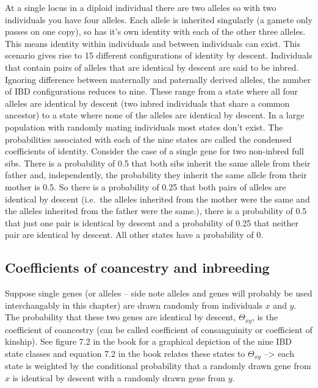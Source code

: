 \documentclass[
]{book}
\begin{document}
At a single locus in a diploid individual there are two alleles so with two individuals you have four alleles. Each allele is inherited singularly (a gamete only passes on one copy), so has it's own identity with each of the other three alleles. This means identity within individuals and between individuals can exist. This scenario gives rise to 15 different configurations of identity by descent. Individuals that contain pairs of alleles that are identical by descent are said to be inbred. Ignoring difference between maternally and paternally derived alleles, the number of IBD configurations reduces to nine. These range from a state where all four alleles are identical by descent (two inbred individuals that share a common ancestor) to a state where none of the alleles are identical by descent. In a large population with randomly mating individuals most states don't exist. The probabilities associated with each of the nine states are called the condensed coefficients of identity. Consider the case of a single gene for two non-inbred full sibs. There is a probability of 0.5 that both sibs inherit the same allele from their father and, independently, the probability they inherit the same allele from their mother is 0.5. So there is a probability of 0.25 that both pairs of alleles are identical by descent (i.e.~the alleles inherited from the mother were the same and the alleles inherited from the father were the same.), there is a probability of 0.5 that just one pair is identical by descent and a probability of 0.25 that neither pair are identical by descent. All other states have a probability of 0.

\hypertarget{coefficients-of-coancestry-and-inbreeding}{%
\subsection{Coefficients of coancestry and inbreeding}\label{coefficients-of-coancestry-and-inbreeding}}

Suppose single genes (or alleles -- side note alleles and genes will probably be used interchangably in this chapter) are drawn randomly from individuals \(x\) and \(y\). The probability that these two genes are identical by descent, \(\Theta_{xy}\), is the coefficient of coancestry (can be called coefficient of consanguinity or coefficient of kinship). See figure 7.2 in the book for a graphical depiction of the nine IBD state classes and equation 7.2 in the book relates these states to \(\Theta_{xy}\) --\textgreater{} each state is weighted by the conditional probability that a randomly drawn gene from \(x\) is identical by descent with a randomly drawn gene from \(y\).
\end{document}
